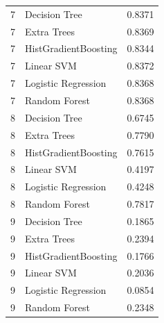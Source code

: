 \begin{tabular}{lll}
7 & Decision Tree & 0.8371 \\
7 & Extra Trees & 0.8369 \\
7 & HistGradientBoosting & 0.8344 \\
7 & Linear SVM & 0.8372 \\
7 & Logistic Regression & 0.8368 \\
7 & Random Forest & 0.8368 \\
8 & Decision Tree & 0.6745 \\
8 & Extra Trees & 0.7790 \\
8 & HistGradientBoosting & 0.7615 \\
8 & Linear SVM & 0.4197 \\
8 & Logistic Regression & 0.4248 \\
8 & Random Forest & 0.7817 \\
9 & Decision Tree & 0.1865 \\
9 & Extra Trees & 0.2394 \\
9 & HistGradientBoosting & 0.1766 \\
9 & Linear SVM & 0.2036 \\
9 & Logistic Regression & 0.0854 \\
9 & Random Forest & 0.2348 \\
\bottomrule
\end{tabular}
